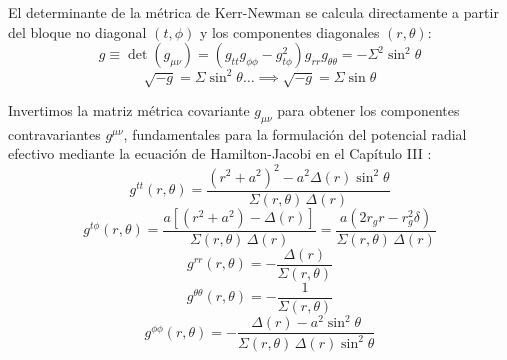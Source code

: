 El determinante de la métrica de Kerr-Newman se calcula directamente a partir del bloque no diagonal $(t,\phi)$ y los componentes diagonales $(r,\theta)$:
\begin{equation}
    g \equiv \det(g_{\mu\nu}) = (g_{tt} g_{\phi\phi} - g_{t\phi}^2) g_{rr} g_{\theta\theta} = -\Sigma^2 \sin^2\theta
    \label{eq:det_kerr_newman}
\end{equation}
\begin{equation}
    \sqrt{-g} = \Sigma \sin^2\theta \dots \implies \sqrt{-g} = \Sigma \sin\theta
    \label{eq:raiz_det_kerr_newman}
\end{equation}

Invertimos la matriz métrica covariante $g_{\mu\nu}$ para obtener los componentes contravariantes $g^{\mu\nu}$, fundamentales para la formulación del potencial radial efectivo mediante la ecuación de Hamilton-Jacobi en el Capítulo III \citep{pdfcoffee.com_chandrasekhar, 1403.5234v2}:
\begin{equation}
    g^{tt}(r,\theta) = \frac{(r^2 + a^2)^2 - a^2 \Delta(r) \sin^2\theta}{\Sigma(r,\theta) \, \Delta(r)}
    \label{eq:g_contra_tt}
\end{equation}
\begin{equation}
    g^{t\phi}(r,\theta) = \frac{a \left[ (r^2 + a^2) - \Delta(r) \right]}{\Sigma(r,\theta) \, \Delta(r)} = \frac{a \left( 2 r_g r - r_g^2 \delta \right)}{\Sigma(r,\theta) \, \Delta(r)}
    \label{eq:g_contra_tphi}
\end{equation}
\begin{equation}
    g^{rr}(r,\theta) = -\frac{\Delta(r)}{\Sigma(r,\theta)}
    \label{eq:g_contra_rr}
\end{equation}
\begin{equation}
    g^{\theta\theta}(r,\theta) = -\frac{1}{\Sigma(r,\theta)}
    \label{eq:g_contra_thetatheta}
\end{equation}
\begin{equation}
    g^{\phi\phi}(r,\theta) = -\frac{\Delta(r) - a^2 \sin^2\theta}{\Sigma(r,\theta) \, \Delta(r) \sin^2\theta}
    \label{eq:g_contra_phiphi}
\end{equation}

